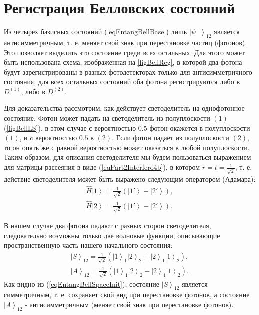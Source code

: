 \section{Регистрация Белловских состояний}
\label{pPart3EntangleBellReg}
Из четырех базисных состояний (\ref{eqEntangBellBase}) лишь 
$\left|\psi^{-}\right>_{12}$ является антисимметричным, т. е. меняет
свой знак при перестановке частиц (фотонов). Это позволяет выделить
это состояние среди всех остальных. Для этого может быть использована
схема, изображенная на \autoref{figBellReg}, в которой два фотона
будут зарегистрированы в разных фотодетекторах только для
антисимметричного состояния, для всех остальных состояний оба фотона
регистрируются либо в $D^{(1)}$, либо в $D^{(2)}$.


 
Для доказательства рассмотрим, как действует светоделитель на однофотонное
состояние. Фотон может падать на светоделитель из полуплоскости
$\left(1\right)$ (\autoref{figBellLS}), в этом случае с вероятностью
$0.5$ фотон окажется в полуплоскости $\left(1\right)$, и c вероятностью
$0.5$ в $\left(2\right)$. Если фотон падает из полуплоскости
$\left(2\right)$, то он опять же с равной вероятностью может оказаться
в любой полуплоскости. 
Таким образом, для описания светоделителя мы будем пользоваться выражением
для матрицы рассеяния в виде (\ref{eqPart2Interfero4b}), в котором
$r=t=\frac{1}{\sqrt{2}}$, т. е. действие светоделителя может быть
выражено следующим оператором (Адамара\cite{bPhisQuantInfo}):
\begin{eqnarray}
\hat{H} \left|1\right> = \frac{1}{\sqrt{2}}
\left(\left|1'\right> +
\left|2'\right>\right),
\nonumber \\
\hat{H} \left|2\right> = \frac{1}{\sqrt{2}}\left(\left|1'\right> -
\left|2'\right>\right).
\label{eqEntangBellHadamar}
\end{eqnarray}

В нашем случае два фотона падают с разных сторон светоделителя,
следовательно возможны только две волновые функции, описывающие
пространственную часть нашего начального состояния:
\begin{eqnarray}
\left|S\right>_{12} = \frac{1}{\sqrt{2}}\left(
\left|1\right>_1\left|2\right>_2 +
\left|2\right>_1\left|1\right>_2\right),
\nonumber \\
\left|A\right>_{12} = \frac{1}{\sqrt{2}}\left(
\left|1\right>_1\left|2\right>_2 -
\left|2\right>_1\left|1\right>_2\right).
\label{eqEntangBellSpaceInit}
\end{eqnarray}
Как видно из (\ref{eqEntangBellSpaceInit}), состояние $\left|S\right>_{12}$
является симметричным, т. е. сохраняет свой вид при перестановке
фотонов, а состояние $\left|A\right>_{12}$ - антисимметричным (меняет свой
знак при перестановке фотонов).


